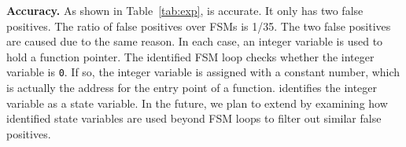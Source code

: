 \noindent\textbf{Accuracy.}
As shown in Table~\ref{tab:exp}, \Tool{} is accurate.
It only has two false positives.
The ratio of false positives over FSMs is 1/35.
The two false positives are caused due to the same reason.
In each case, an integer variable is used to hold a function pointer.
The identified FSM loop checks whether the integer variable is \texttt{0}.
If so, the integer variable is assigned with a constant number,
which is actually the address for the entry point of a function.
\Tool{} identifies the integer variable as a state variable.
In the future, we plan to extend \Tool{} by examining how identified
state variables are used beyond FSM
loops to filter out similar false positives.




